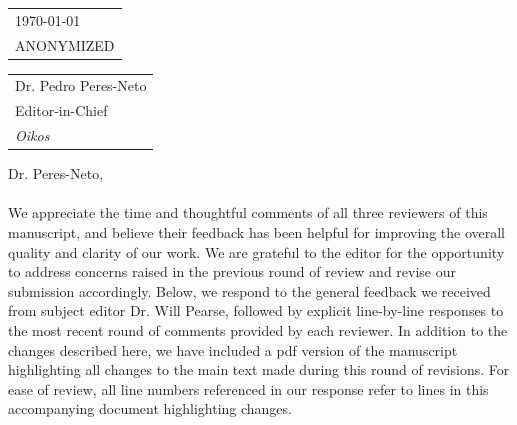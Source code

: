 \documentclass{article}
\begin{document}
\hfill
\begin{tabular}{l @{}}
	\today \bigskip\\ %
	ANONYMIZED\\
\end{tabular}

\bigskip %


\begin{tabular}{@{} l}
    Dr. Pedro Peres-Neto \\
	Editor-in-Chief \\
	\emph{Oikos} \\
\end{tabular}

\bigskip %

Dr. Peres-Neto,


\paragraph{}

We appreciate the time and thoughtful comments of all three reviewers of this manuscript, and believe their feedback has been helpful for improving the overall quality and clarity of our work. We are grateful to the editor for the opportunity to address concerns raised in the previous round of review and revise our submission accordingly. Below, we respond to the general feedback we received from subject editor Dr. Will Pearse, followed by explicit line-by-line responses to the most recent round of comments provided by each reviewer. In addition to the changes described here, we have included a pdf version of the manuscript highlighting all changes to the main text made during this round of revisions. For ease of review, all line numbers referenced in our response refer to lines in this accompanying document highlighting changes. 
\\
\end{document}

